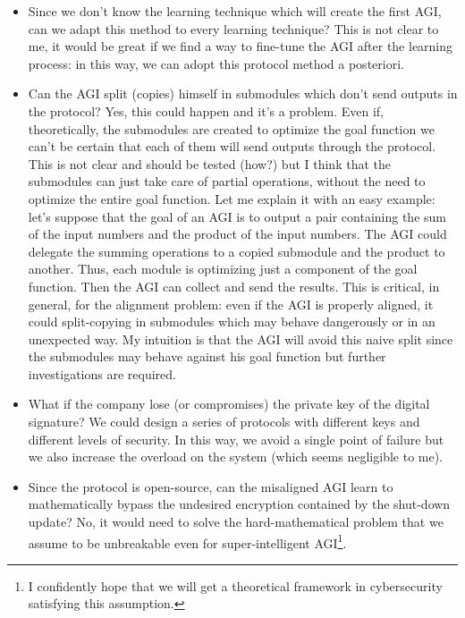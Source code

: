 \documentclass{article}
\begin{document}
\begin{itemize}
    \item Since we don't know the learning technique which will create the first AGI, can we adapt this method to every learning technique? This is not clear to me, it would be great if we find a way to fine-tune the AGI after the learning process: in this way, we can adopt this protocol method a posteriori. 

    \item Can the AGI split (copies) himself in submodules which don't send outputs in the protocol? Yes, this could happen and it's a problem. Even if, theoretically, the submodules are created to optimize the goal function we can't be certain that each of them will send outputs through the protocol. 
    This is not clear and should be tested (how?) but I think that the submodules can just take care of partial operations, without the need to optimize the entire goal function. 
    Let me explain it with an easy example: let's suppose that the goal of an AGI is to output a pair containing the sum of the input numbers and the product of the input numbers. The AGI could delegate the summing operations to a copied submodule and the product to another. Thus, each module is optimizing just a component of the goal function. Then the AGI can collect and send the results.
    This is critical, in general, for the alignment problem: even if the AGI is properly aligned, it could split-copying in submodules which may behave dangerously or in an unexpected way.
    My intuition is that the AGI will avoid this naive split since the submodules may behave against his goal function but further investigations are required.

    \item What if the company lose (or compromises) the private key of the digital signature? We could design a series of protocols with different keys and different levels of security. 
    In this way, we avoid a single point of failure but we also increase the overload on the system (which seems negligible to me).
    
    \item Since the protocol is open-source, can the misaligned AGI learn to mathematically bypass the undesired encryption contained by the shut-down update? No, it would need to solve the hard-mathematical problem that we assume to be unbreakable even for super-intelligent AGI\footnote{I confidently hope that we will get a theoretical framework in cybersecurity satisfying this assumption.}.
    
\end{itemize}
    
\end{document}
